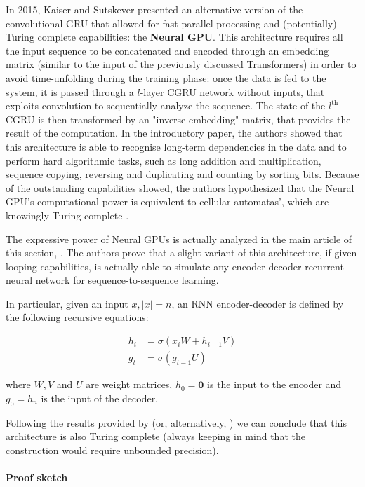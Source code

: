 \documentclass{article}
\begin{document}
In 2015, Kaiser and Sutskever \cite{KAI15} presented an alternative version of the convolutional GRU that allowed for fast parallel processing and (potentially) Turing complete capabilities: the \textbf{Neural GPU}. This architecture requires all the input sequence to be concatenated and encoded through an embedding matrix (similar to the input of the previously discussed Transformers) in order to avoid time-unfolding during the training phase: once the data is fed to the system, it is passed through a $l$-layer CGRU network without inputs, that exploits convolution to sequentially analyze the sequence. The state of the $l^{\textrm{th}}$ CGRU is then transformed by an "inverse embedding" matrix, that provides the result of the computation. In the introductory paper, the authors showed that this architecture is able to recognise long-term dependencies in the data and to perform hard algorithmic tasks, such as long addition and multiplication, sequence copying, reversing and duplicating and counting by sorting bits. Because of the outstanding capabilities showed, the authors hypothesized that the Neural GPU's computational power is equivalent to cellular automatas', which are knowingly Turing complete \cite{COO04}.

The expressive power of Neural GPUs is actually analyzed in the main article of this section, \cite{PER19}. The authors prove that a slight variant of this architecture, if given looping capabilities, is actually able to simulate any encoder-decoder recurrent neural network for sequence-to-sequence learning. 

In particular, given an input $x, |x|=n$, an RNN encoder-decoder is defined by the following recursive equations:

\begin{align}
    h_i &= \sigma(x_iW + h_{i-1}V)\\
    g_t &= \sigma(g_{t-1}U)
\end{align}

where $W, V$ and $U$ are weight matrices, $h_0 = \mathbf{0}$ is the input to the encoder and $g_0 = h_n$ is the input of the decoder.

Following the results provided by \cite{SIE95} (or, alternatively, \cite{CHU21}) we can conclude that this architecture is also Turing complete (always keeping in mind that the construction would require unbounded precision).

\paragraph{Proof sketch}
\end{document}
